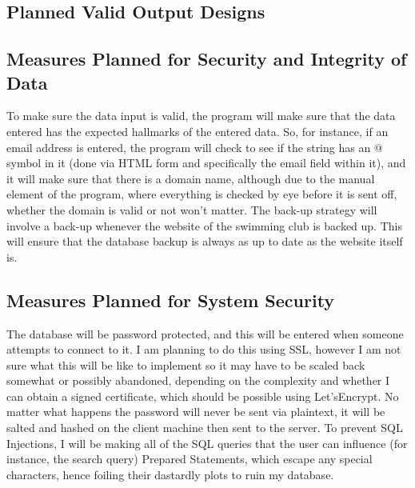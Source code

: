 \documentclass[
11pt, %
a4paper, %
oneside, %
headinclude,footinclude, %
BCOR5mm, %
]{scrartcl}
\begin{document}
\subsection{Planned Valid Output Designs}

\subsection{Measures Planned for Security and Integrity of Data}
To make sure the data input is valid, the program will make sure that the data entered has the expected hallmarks of the entered data. So, for instance, if an email address is entered, the program will check to see if the string has an @ symbol in it (done via HTML form and specifically the email field within it), and it will make sure that there is a domain name, although due to the manual element of the program, where everything is checked by eye before it is sent off, whether the domain is valid or not won't matter. The back-up strategy will involve a back-up whenever the website of the swimming club is backed up. This will ensure that the database backup is always as up to date as the website itself is.

\subsection{Measures Planned for System Security}
The database will be password protected, and this will be entered when someone attempts to connect to it. I am planning to do this using SSL, however I am not sure what this will be like to implement so it may have to be scaled back somewhat or possibly abandoned, depending on the complexity and whether I can obtain a signed certificate, which should be possible using Let'sEncrypt. No matter what happens the password will never be sent via plaintext, it will be salted and hashed on the client machine then sent to the server. To prevent SQL Injections, I will be making all of the SQL queries that the user can influence (for instance, the search query) Prepared Statements, which escape any special characters, hence foiling their dastardly plots to ruin my database. 
\end{document}

